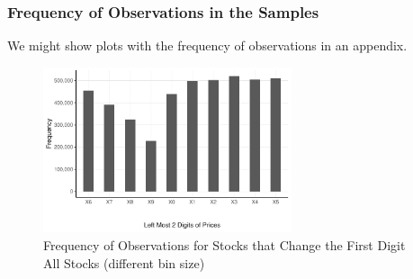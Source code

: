 \clearpage

\subsubsection{Frequency of Observations in the Samples}

We might show plots with the frequency of observations in an appendix.

\begin{figure}[h]
	\centering%
	\caption{Frequency of Observations for Stocks that Change the First Digit \\ All Stocks (different bin size)}%
	\label{fig:}%
	\includegraphics[width=0.65\textwidth]{figures/left2_second_decrease_count.pdf}
	\fignote{}
\end{figure}





